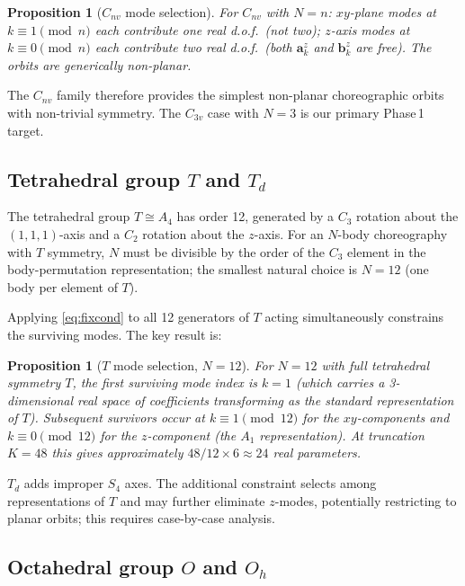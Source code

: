 \documentclass[12pt, a4paper]{article}
\theoremstyle{plain}
\newtheorem{proposition}[theorem]{Proposition}
\theoremstyle{definition}
\newcommand{\bfa}{\mathbf{a}}
\newcommand{\bfb}{\mathbf{b}}
\begin{document}
\begin{proposition}[$C_{nv}$ mode selection]\label{prop:cnv}
For $C_{nv}$ with $N=n$:
$xy$-plane modes at $k \equiv 1 \pmod{n}$ each contribute one
real d.o.f.\ (not two); $z$-axis modes at $k \equiv 0 \pmod{n}$
each contribute two real d.o.f.\ (both $\bfa_k^z$ and $\bfb_k^z$ are free).
The orbits are generically \emph{non-planar}.
\end{proposition}

The $C_{nv}$ family therefore provides the simplest non-planar
choreographic orbits with non-trivial symmetry.  The $C_{3v}$ case
with $N=3$ is our primary Phase\,1 target.

\subsection{Tetrahedral group $T$ and $T_d$}

The tetrahedral group $T \cong A_4$ has order 12, generated by a
$C_3$ rotation about the $(1,1,1)$-axis and a $C_2$ rotation about
the $z$-axis.  For an $N$-body choreography with $T$ symmetry, $N$
must be divisible by the order of the $C_3$ element in the body-permutation
representation; the smallest natural choice is $N=12$ (one body per
element of $T$).

Applying \eqref{eq:fixcond} to all 12 generators of $T$ acting
simultaneously constrains the surviving modes.  The key result is:

\begin{proposition}[$T$ mode selection, $N=12$]\label{prop:T}
For $N=12$ with full tetrahedral symmetry $T$, the first
surviving mode index is $k=1$ (which carries a 3-dimensional
real space of coefficients transforming as the standard
representation of $T$).  Subsequent survivors occur at
$k \equiv 1 \pmod{12}$ for the $xy$-components and
$k \equiv 0 \pmod{12}$ for the $z$-component (the $A_1$
representation).  At truncation $K=48$ this gives approximately
$48/12 \times 6 \approx 24$ real parameters.
\end{proposition}

$T_d$ adds improper $S_4$ axes.  The additional constraint selects
among representations of $T$ and may further eliminate $z$-modes,
potentially restricting to planar orbits; this requires case-by-case
analysis.

\subsection{Octahedral group $O$ and $O_h$}
\end{document}
